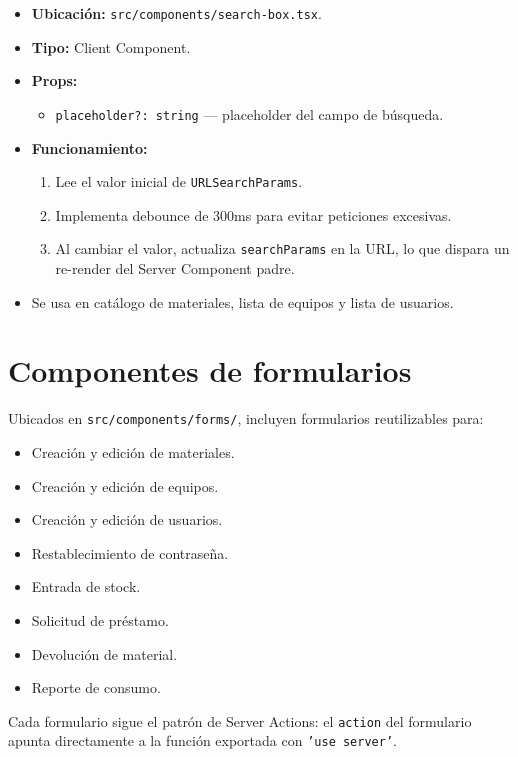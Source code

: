 \documentclass[12pt,a4paper,oneside]{report}
\newcommand{\file}[1]{\texttt{\color{cecyteDark}#1}}
\begin{document}
\begin{itemize}
  \item \textbf{Ubicación:} \file{src/components/search-box.tsx}.
  \item \textbf{Tipo:} Client Component.
  \item \textbf{Props:}
    \begin{itemize}
      \item \file{placeholder?: string} — placeholder del campo de búsqueda.
    \end{itemize}
  \item \textbf{Funcionamiento:}
    \begin{enumerate}
      \item Lee el valor inicial de \file{URLSearchParams}.
      \item Implementa debounce de 300ms para evitar peticiones excesivas.
      \item Al cambiar el valor, actualiza \file{searchParams} en la URL, lo que dispara un re-render del Server Component padre.
    \end{enumerate}
  \item Se usa en catálogo de materiales, lista de equipos y lista de usuarios.
\end{itemize}

\section{Componentes de formularios}

Ubicados en \file{src/components/forms/}, incluyen formularios reutilizables para:

\begin{itemize}
  \item Creación y edición de materiales.
  \item Creación y edición de equipos.
  \item Creación y edición de usuarios.
  \item Restablecimiento de contraseña.
  \item Entrada de stock.
  \item Solicitud de préstamo.
  \item Devolución de material.
  \item Reporte de consumo.
\end{itemize}

Cada formulario sigue el patrón de Server Actions: el \file{action} del formulario apunta directamente a la función exportada con \file{'use server'}.
\end{document}
